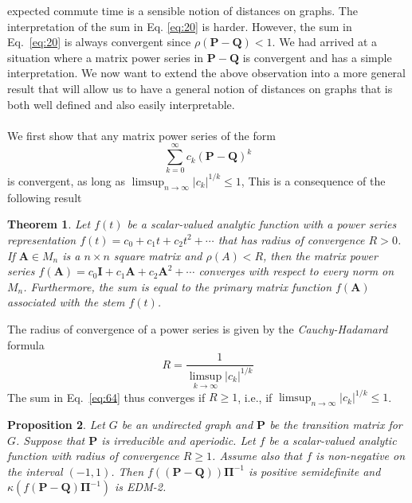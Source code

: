 \documentclass[10pt,twocolumn]{article}
\newtheorem{theorem}{Theorem}
\newtheorem{proposition}[theorem]{Proposition}
\numberwithin{equation}{section}
\begin{document}
expected commute time is a sensible notion of distances on graphs. The
interpretation of the sum in Eq. \eqref{eq:20} is harder.  However,
the sum in Eq.~\eqref{eq:20} is always convergent since
$\rho(\mathbf{P} - \mathbf{Q}) < 1$. We had  arrived at a
situation where a matrix power series in $\mathbf{P} - \mathbf{Q}$ is
convergent and has a simple interpretation. We now want
to extend the above observation into a more general result that will
allow us to have a general notion of distances on
graphs that is both well defined and also easily interpretable. \\ \\
\noindent
We first show that any matrix power series of the form
\begin{equation}
  \label{eq:64}
  \sum_{k=0}^{\infty}{c_k (\mathbf{P} - \mathbf{Q})^{k}}
\end{equation}
is convergent, as long as $\limsup_{n \rightarrow \infty} |c_k|^{1/k}
\leq 1$, This is a consequence of the following result \cite[\S
6.2]{horn94:_topic_in_matrix_analy}
\begin{theorem}
  \label{thm:3}
  Let $f(t)$ be a scalar-valued analytic function with a power series
  representation $f(t) = c_0 + c_1t + c_2 t^2 + \cdots$ that has radius
  of convergence $R > 0$. If $\mathbf{A} \in M_n$ is a $n \times n$
  square matrix and $\rho(A) < R$, then the matrix power series
  $f(\mathbf{A}) = c_0 \mathbf{I} + c_1 \mathbf{A} + c_2 \mathbf{A}^2
  + \cdots$ converges with respect to every norm on $M_n$. Furthermore,
  the sum is equal to the primary matrix function $f(\mathbf{A})$
  associated with the stem $f(t)$.
\end{theorem}
The radius of convergence of a power series is given by the {\em
  Cauchy-Hadamard} \/ formula \cite[\S V.3]{gamelin01:_compl_analy}
\begin{equation}
  \label{eq:65}
  R = \frac{1}{\limsup_{k \rightarrow \infty}{|c_k|^{1/k}}}
\end{equation}
The sum in Eq.~\eqref{eq:64} thus converges if $R \geq 1$, i.e.,
if $\limsup_{n \rightarrow \infty} |c_k|^{1/k} \leq 1$. 
\begin{proposition}
  \label{prop:13}
  Let $G$ be an undirected graph and $\mathbf{P}$ be the transition
  matrix for $G$. Suppose that $\mathbf{P}$ is irreducible and
  aperiodic.  Let $f$ be a scalar-valued analytic function with radius
  of convergence $R \geq 1$. Assume also that $f$ is non-negative on
  the interval $(-1,1)$. Then $f((\mathbf{P} -
  \mathbf{Q}))\bm{\Pi}^{-1}$ is positive semidefinite
  and $\kappa(f(\mathbf{P} - \mathbf{Q})\bm{\Pi}^{-1})$ is 
  EDM-2.
\end{proposition}
\end{document}
